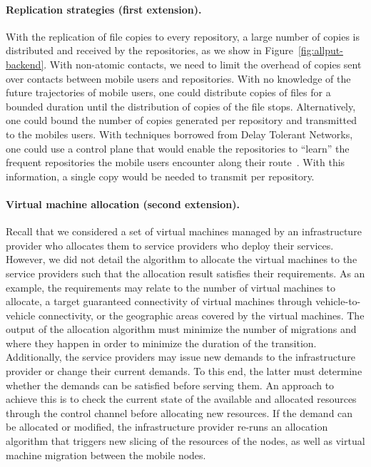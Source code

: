 \paragraph{Replication strategies (first extension).}
With the replication of file copies to every repository, a large number of copies is distributed and received by the repositories, as we show in Figure~\ref{fig:allput-backend}. With non-atomic contacts, we need to limit the overhead of copies sent over contacts between mobile users and repositories. With no knowledge of the future trajectories of mobile users, one could distribute copies of files for a bounded duration until the distribution of copies of the file stops. Alternatively, one could bound the number of copies generated per repository and transmitted to the mobiles users. With techniques borrowed from Delay Tolerant Networks, one could use a control plane that would enable the repositories to ``learn'' the frequent repositories the mobile users encounter along their route~\cite{lindgren2003probabilistic,grossglauser2006locating}. With this information, a single copy would be needed to transmit per repository. 

\paragraph{Virtual machine allocation (second extension).}
Recall that we considered a set of virtual machines managed by an infrastructure provider who allocates them to service providers who deploy their services. However, we did not detail the algorithm to allocate the virtual machines to the service providers such that the allocation result satisfies their requirements. As an example, the requirements may relate to the number of virtual machines to allocate, a target guaranteed connectivity of virtual machines through vehicle-to-vehicle connectivity, or the geographic areas covered by the virtual machines. The output of the allocation algorithm must minimize the number of migrations and where they happen in order to minimize the duration of the transition. Additionally, the service providers may issue new demands to the infrastructure provider or change their current demands. To this end, the latter must determine whether the demands can be satisfied before serving them. An approach to achieve this is to check the current state of the available and allocated resources through the control channel before allocating new resources. If the demand can be allocated or modified, the infrastructure provider re-runs an allocation algorithm that triggers new slicing of the resources of the nodes, as well as virtual machine migration between the mobile nodes.

